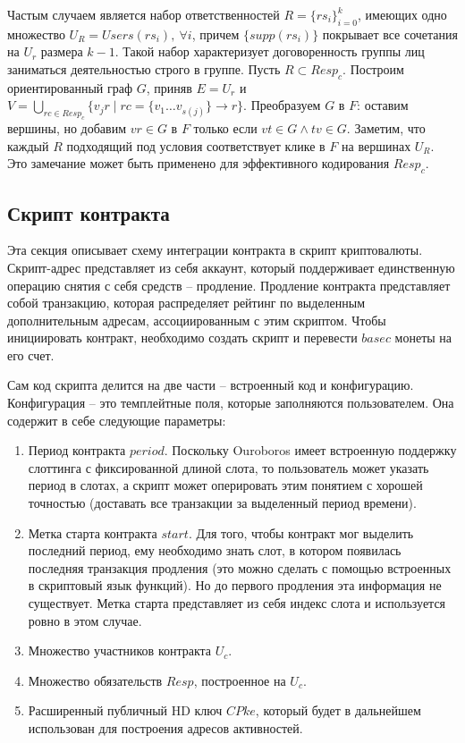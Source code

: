 \documentclass[specification,annotation]{itmo-student-thesis}
\begin{document}
Частым случаем является набор ответственностей $R = \{rs_i\}_{i=0}^k$,
имеющих одно множество $U_R = Users(rs_i), \ \forall i $, причем
$\{supp(rs_i)\}$ покрывает все сочетания на $U_r$ размера $k-1$. Такой
набор характеризует договоренность группы лиц заниматься деятельностью
строго в группе. Пусть $R \subset Resp_c$. Построим ориентированный
граф $G$, приняв $E = U_r$ и $V = \bigcup_{rc \in Resp_c}{\{v_jr \mid
  rc = \{v_1\ldots v_{s(j)}\} \rightarrow r\}}$. Преобразуем $G$ в
$F$: оставим вершины, но добавим $vr \in G$ в $F$ только если $vt \in
G \wedge tv \in G$. Заметим, что каждый $R$ подходящий под условия
соответствует клике в $F$ на вершинах $U_R$. Это замечание может быть
применено для эффективного кодирования $Resp_c$.

\subsection{Скрипт контракта}

Эта секция описывает схему интеграции контракта в скрипт
криптовалюты. Скрипт-адрес представляет из себя аккаунт, который
поддерживает единственную операцию снятия с себя средств --
продление. Продление контракта представляет собой транзакцию, которая
распределяет рейтинг по выделенным дополнительным адресам,
ассоциированным с этим скриптом. Чтобы инициировать контракт,
необходимо создать скрипт и перевести $basec$ монеты на его счет.

Сам код скрипта делится на две части -- встроенный код и
конфигурацию. Конфигурация -- это темплейтные поля, которые
заполняются пользователем. Она содержит в себе следующие параметры:

\begin{enumerate}
\item Период контракта $period$. Поскольку Ouroboros имеет встроенную
  поддержку слоттинга с фиксированной длиной слота, то пользователь
  может указать период в слотах, а скрипт может оперировать этим
  понятием с хорошей точностью (доставать все транзакции за выделенный
  период времени).
\item Метка старта контракта $start$. Для того, чтобы контракт мог
  выделить последний период, ему необходимо знать слот, в котором
  появилась последняя транзакция продления (это можно сделать с
  помощью встроенных в скриптовый язык функций). Но до первого
  продления эта информация не существует. Метка старта представляет из
  себя индекс слота и используется ровно в этом случае.
\item Множество участников контракта $U_c$.
\item Множество обязательств $Resp$, построенное на $U_c$.
\item Расширенный публичный HD ключ $CPke$, который будет в дальнейшем
  использован для построения адресов активностей.
\end{enumerate}
\end{document}
